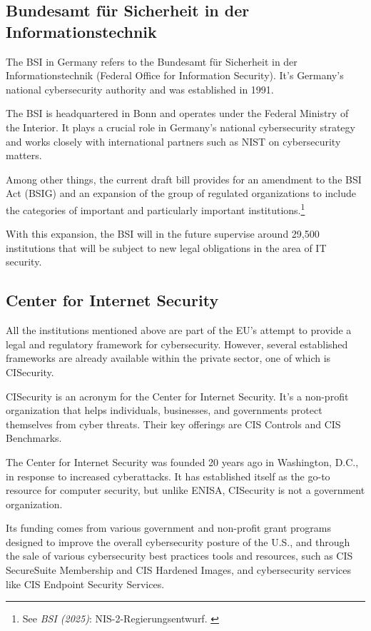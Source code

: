 \subsection{Bundesamt für Sicherheit in der Informationstechnik}

The BSI in Germany refers to the Bundesamt für Sicherheit in der Informationstechnik (Federal Office for Information Security). It's Germany's national cybersecurity authority and was established in 1991.

The BSI is headquartered in Bonn and operates under the Federal Ministry of the Interior. It plays a crucial role in Germany's national cybersecurity strategy and works closely with international partners such as NIST on cybersecurity matters.

Among other things, the current draft bill provides for an amendment to the BSI Act (BSIG) and an expansion of the group of regulated organizations to include the categories of important and particularly important institutions.\footnote{See \textit{BSI (2025)}: NIS-2-Regierungsentwurf. \cite{presseNis2}}

With this expansion, the BSI will in the future supervise around 29,500 institutions that will be subject to new legal obligations in the area of IT security.

\subsection{Center for Internet Security}

All the institutions mentioned above are part of the EU's attempt to provide a legal and regulatory framework for cybersecurity. However, several established frameworks are already available within the private sector, one of which is CISecurity.

CISecurity is an acronym for the Center for Internet Security. It's a non-profit organization that helps individuals, businesses, and governments protect themselves from cyber threats. Their key offerings are CIS Controls and CIS Benchmarks.

The Center for Internet Security was founded 20 years ago in Washington, D.C., in response to increased cyberattacks. It has established itself as the go-to resource for computer security, but unlike ENISA, CISecurity is not a government organization.

Its funding comes from various government and non-profit grant programs designed to improve the overall cybersecurity posture of the U.S., and through the sale of various cybersecurity best practices tools and resources, such as CIS SecureSuite Membership and CIS Hardened Images, and cybersecurity services like CIS Endpoint Security Services.

